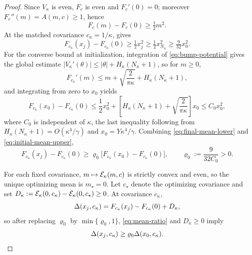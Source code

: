 \begin{proof}
    Since $V_\kappa$ is even, $F_c$ is even and $F_c'(0)=0$; moreover $F_c''(m)=A(m,c)\geq1$,
    hence
    \begin{equation}\label{eq:Fc-lower}
        F_c(m)-F_c(0)\geq\tfrac12m^2 .
    \end{equation}
    At the matched covariance $c_\kappa=1/\kappa$,  gives
    \begin{equation}\label{eq:final-mean-lower}
        F_{c_\kappa}(x_j)-F_{c_\kappa}(0)
        \geq\tfrac12x_j^2
        \geq\tfrac12x_{N_\kappa}^2
        \geq\tfrac9{32}x_0^2 .
    \end{equation}
    For the converse bound at initialization, integration of \eqref{eq:bump-potential} gives
    the global estimate $|V_\kappa'(\theta)|\leq|\theta|+H_\kappa(N_\kappa+1)$, so for
    $m\geq0$,
    \begin{equation*}
        F_{c_\kappa}'(m)\leq m+\sqrt{\frac2{\pi\kappa}}+H_\kappa(N_\kappa+1),
    \end{equation*}
    and integrating from zero to $x_0$ yields
    \begin{equation}\label{eq:initial-mean-upper}
        F_{c_\kappa}(x_0)-F_{c_\kappa}(0)
        \leq\frac12x_0^2
        +\left[H_\kappa(N_\kappa+1)+\sqrt{\frac2{\pi\kappa}}\right]x_0
        \leq C_0x_0^2,
    \end{equation}
    where $C_0$ is independent of $\kappa$, the last inequality following from
    $H_\kappa(N_\kappa+1)=O(\kappa^4/\gamma)$ and $x_0=Y\kappa^4/\gamma$. Combining
    \eqref{eq:final-mean-lower} and \eqref{eq:initial-mean-upper},
    \begin{equation}\label{eq:mean-ratio}
        F_{c_\kappa}(x_j)-F_{c_\kappa}(0)
        \geq\varrho_0\bigl[F_{c_\kappa}(x_0)-F_{c_\kappa}(0)\bigr],
        \qquad
        \varrho_0:=\frac9{32C_0}>0 .
    \end{equation}

    For each fixed covariance, $m\mapsto\mathcal{E}_\kappa(m,c)$ is strictly convex and even, so the
    unique optimizing mean is $m_\star=0$. Let $c_\star$ denote the optimizing covariance and
    set $D_\kappa:=\mathcal{E}_\kappa(0,c_\kappa)-\mathcal{E}_\kappa(0,c_\star)\geq0$. At covariance
    $c_\kappa$,
    \begin{equation*}
        \Delta(x_j,c_\kappa)=F_{c_\kappa}(x_j)-F_{c_\kappa}(0)+D_\kappa,
    \end{equation*}
    so after replacing $\varrho_0$ by $\min\{\varrho_0,1\}$, \eqref{eq:mean-ratio} and
    $D_\kappa\geq0$ imply
    \begin{equation}\label{eq:ideal-gap-ratio}
        \Delta(x_j,c_\kappa)\geq\varrho_0\Delta(x_0,c_\kappa).
    \end{equation}


\end{proof}
